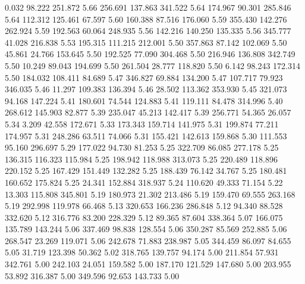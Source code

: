    0.032   98.222  251.872         5.66
 256.691  137.863  341.522         5.64
 174.967   90.301  285.846         5.64
 112.312  125.461   67.597         5.60
 160.388   87.516  176.060         5.59
 355.430  142.276  262.924         5.59
 192.563   60.064  248.935         5.56
 142.216  140.250  135.335         5.56
 345.777   41.028  216.838         5.53
 195.315  111.215  212.001         5.50
 357.863   87.142  102.069         5.50
  45.861   24.766  153.645         5.50
 192.525   77.090  304.468         5.50
 216.946  136.808  342.749         5.50
  10.249   89.043  194.699         5.50
 261.504   28.777  118.820         5.50
   6.142   98.243  172.314         5.50
 184.032  108.411   84.689         5.47
 346.827   69.884  134.200         5.47
 107.717   79.923  346.035         5.46
  11.297  109.383  136.394         5.46
  28.502  113.362  353.930         5.45
 321.073   94.168  147.224         5.41
 180.601   74.544  124.883         5.41
 119.111   84.478  314.996         5.40
 268.612  145.903   82.877         5.39
 235.047   45.213  142.417         5.39
 256.771   54.365   26.057         5.34
   3.209   42.558  172.671         5.33
 173.343  159.714  141.975         5.31
 199.874   77.211  174.957         5.31
 248.286   63.511   74.066         5.31
 155.421  142.613  159.868         5.30
 111.553   95.160  296.697         5.29
 177.022   94.730   81.253         5.25
 322.709   86.085  277.178         5.25
 136.315  116.323  115.984         5.25
 198.942  118.988  313.073         5.25
 220.489  118.896  220.152         5.25
 167.429  151.449  132.282         5.25
 188.439   76.142   34.767         5.25
 180.481  160.652  175.824         5.25
  24.341  152.884  318.937         5.24
 110.620   49.333   71.154         5.22
  13.303  115.808  345.801         5.19
 180.973   21.302  213.486         5.19
 159.470   69.555  263.168         5.19
 292.998  119.978   66.468         5.13
 320.653  166.236  286.848         5.12
  94.340   88.528  332.620         5.12
 316.776   83.200  228.329         5.12
  89.365   87.604  338.364         5.07
 166.075  135.789  143.244         5.06
 337.469   98.838  128.554         5.06
 350.287   85.569  252.885         5.06
 268.547   23.269  119.071         5.06
 242.678   71.883  238.987         5.05
 344.459   86.097   84.655         5.05
  31.719  123.398   50.362         5.02
 318.765  139.757   94.174         5.00
 211.854   57.931  342.761         5.00
 242.103   24.051  159.582         5.00
 187.170  121.529  147.680         5.00
 203.955   53.892  316.387         5.00
 349.596   92.653  143.733         5.00
